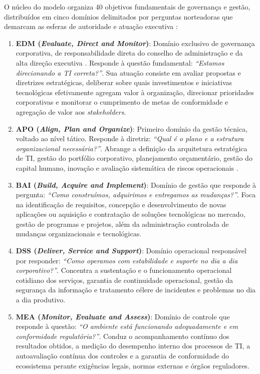 O núcleo do modelo organiza 40 objetivos fundamentais de governança e gestão, distribuídos em cinco domínios delimitados por perguntas norteadoras que demarcam as esferas de autoridade e atuação executiva \cite{isaca2019governance}:

\begin{enumerate}
    \item \textbf{EDM (\textit{Evaluate, Direct and Monitor})}: Domínio exclusivo de governança corporativa, de responsabilidade direta do conselho de administração e da alta direção executiva \cite{isaca2019governance}. Responde à questão fundamental: \textit{``Estamos direcionando a TI correta?''}. Sua atuação consiste em avaliar propostas e diretrizes estratégicas, deliberar sobre quais investimentos e iniciativas tecnológicas efetivamente agregam valor à organização, direcionar prioridades corporativas e monitorar o cumprimento de metas de conformidade e agregação de valor aos \textit{stakeholders}.
    \item \textbf{APO (\textit{Align, Plan and Organize})}: Primeiro domínio da gestão técnica, voltado ao nível tático. Responde à diretriz: \textit{``Qual é o plano e a estrutura organizacional necessária?''}. Abrange a definição da arquitetura estratégica de TI, gestão do portfólio corporativo, planejamento orçamentário, gestão do capital humano, inovação e avaliação sistemática de riscos operacionais \cite{isaca2019governance}.
    \item \textbf{BAI (\textit{Build, Acquire and Implement})}: Domínio de gestão que responde à pergunta: \textit{``Como construímos, adquirimos e entregamos as mudanças?''}. Foca na identificação de requisitos, concepção e desenvolvimento de novas aplicações ou aquisição e contratação de soluções tecnológicas no mercado, gestão de programas e projetos, além da administração controlada de mudanças organizacionais e tecnológicas.
    \item \textbf{DSS (\textit{Deliver, Service and Support})}: Domínio operacional responsável por responder: \textit{``Como operamos com estabilidade e suporte no dia a dia corporativo?''}. Concentra a sustentação e o funcionamento operacional cotidiano dos serviços, garantia de continuidade operacional, gestão da segurança da informação e tratamento célere de incidentes e problemas no dia a dia produtivo.
    \item \textbf{MEA (\textit{Monitor, Evaluate and Assess})}: Domínio de controle que responde à questão: \textit{``O ambiente está funcionando adequadamente e em conformidade regulatória?''}. Conduz o acompanhamento contínuo dos resultados obtidos, a medição do desempenho interno dos processos de TI, a autoavaliação contínua dos controles e a garantia de conformidade do ecossistema perante exigências legais, normas externas e órgãos reguladores.
\end{enumerate}

